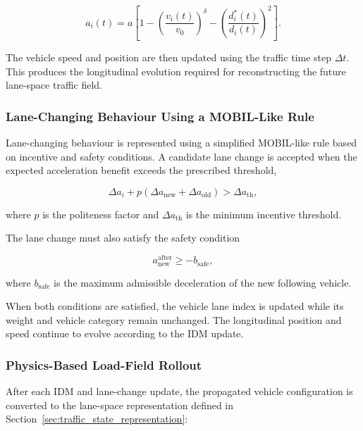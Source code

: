 \documentclass[journal]{IEEEtran}
\begin{document}
\begin{equation}
a_i(t)
=
a
\left[
1
-
\left(
\frac{v_i(t)}{v_0}
\right)^{\delta}
-
\left(
\frac{d_i^{*}(t)}{d_i(t)}
\right)^2
\right].
\end{equation}

The vehicle speed and position are then updated using the traffic time step $\Delta t$. This produces the longitudinal evolution required for reconstructing the future lane-space traffic field.


\subsubsection{Lane-Changing Behaviour Using a MOBIL-Like Rule}

Lane-changing behaviour is represented using a simplified MOBIL-like rule based on incentive and safety conditions. A candidate lane change is accepted when the expected acceleration benefit exceeds the prescribed threshold,

\begin{equation}
\Delta a_i
+
p
\left(
\Delta a_{\mathrm{new}}
+
\Delta a_{\mathrm{old}}
\right)
>
\Delta a_{\mathrm{th}},
\end{equation}

where $p$ is the politeness factor and $\Delta a_{\mathrm{th}}$ is the minimum incentive threshold.

The lane change must also satisfy the safety condition

\begin{equation}
a_{\mathrm{new}}^{\mathrm{after}}
\geq
-b_{\mathrm{safe}},
\end{equation}

where $b_{\mathrm{safe}}$ is the maximum admissible deceleration of the new following vehicle.

When both conditions are satisfied, the vehicle lane index is updated while its weight and vehicle category remain unchanged. The longitudinal position and speed continue to evolve according to the IDM update.


\subsubsection{Physics-Based Load-Field Rollout}

After each IDM and lane-change update, the propagated vehicle configuration is converted to the lane-space representation defined in Section~\ref{sec:traffic_state_representation}:
\end{document}
